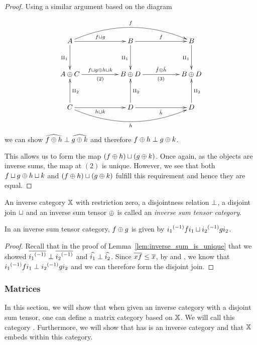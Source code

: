 \begin{proof}
  Using a similar argument based on the diagram

  \[
    \xymatrix@R+10pt@C+28pt {
      A \ar[r]^{f\djoin g} \ar[d]_{\cpa} \ar@/^20pt/[rr]^f
        & B \ar[r]^{f} \ar[d]_{\cpa}  & B \ar[d]_{\cpa}\\
      A\+C  \ar[r]^{f\djoin g \+ h\djoin k}_{(2)}
        & B\+D \ar[r]^{\rg{f}\+\rg{h}}_{(3)}   & B \+D \\
      C  \ar[r]_{h\djoin k} \ar[u]_{\cpb} \ar@/_20pt/[rr]_h
        & D\ar[r]_{\rg{h}} \ar[u]_{\cpb}  & D \ar[u]_{\cpb}
    }
  \]
  we can show $\widehat{f\oplus h} \perp \widehat{g\oplus k}$ and therefore $f\oplus h \perp g\oplus k$.

  This allows us to form the map $(f\oplus h) \sqcup (g\oplus k)$. Once again, as the objects are inverse
  sums, the map at $(2)$ is unique.
  However, we see that both $f\sqcup g \oplus h\sqcup k$ and $(f\oplus h) \sqcup (g\oplus k)$ fulfill this
  requirement and hence they are equal.
\end{proof}


\begin{definition}\label{def:inverse_sum_tensor_category}
  An inverse category $\mathbb{X}$ with restriction zero, a disjointness relation $\perp$, a disjoint
  join $\sqcup$ and an inverse sum tensor $\oplus$ is called an \emph{inverse sum tensor category}.
\end{definition}

\begin{corollary}\label{cor:inverse_sum_of_maps_is_disjoint_join}
  In an inverse sum tensor category, $f \oplus g$ is given by ${i_1}^{(-1)} f i_1 \sqcup {i_2}^{(-1)} g i_2$.
\end{corollary}
\begin{proof}
  Recall that in the proof of Lemma~\ref{lem:inverse_sum_is_unique} that we showed $\overline{{i_1}^{(-1)}}
  \perp \overline{{i_2}^{(-1)}}$ and $\widehat{i_1}\perp \widehat{i_2}$. Since $\overline{x f} \le \overline{x}$, by
   and , we know that ${i_1}^{(-1)} f i_1 \perp {i_2}^{(-1)} g i_2$ and we
  can therefore form the disjoint join.
\end{proof}



\subsubsection{Matrices} %
\label{ssub:matrix_representation}
In this section, we will show that when given an inverse  category \X with a disjoint sum
tensor, one can define a
matrix category based on $\mathbb{X}$. We will call this category \imatx. Furthermore, we will
show that \imatx has is an inverse category and that $\mathbb{X}$ embeds within this category.

